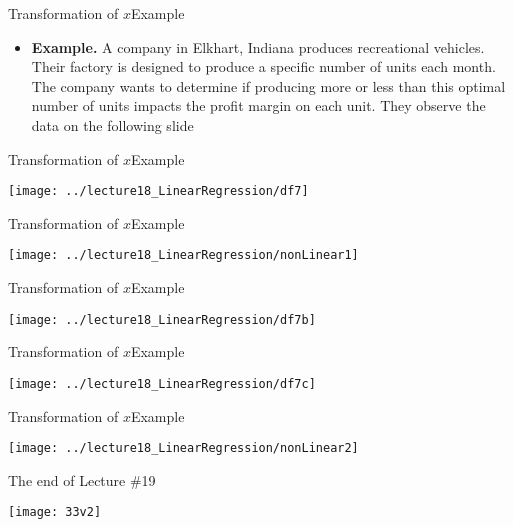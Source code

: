 \documentclass[xcolor=dvipsnames]{beamer}
\begin{document}
\begin{frame}{Transformation of $x$}{Example}
	\begin{itemize}
		\item \textbf{Example.} A company in Elkhart, Indiana produces recreational vehicles. Their factory is designed to produce a specific number of units each month. The company wants to determine if producing more or less than this optimal number of units impacts the profit margin on each unit. They observe the data on the following slide
	\end{itemize}
\end{frame}

\begin{frame}{Transformation of $x$}{Example}
	\begin{center}
		\texttt{[image: ../lecture18\_LinearRegression/df7]}
	\end{center}
\end{frame}

\begin{frame}{Transformation of $x$}{Example}
	\begin{center}
		\texttt{[image: ../lecture18\_LinearRegression/nonLinear1]}
	\end{center}
\end{frame}

\begin{frame}{Transformation of $x$}{Example}
	\begin{center}
		\texttt{[image: ../lecture18\_LinearRegression/df7b]}
	\end{center}
\end{frame}

\begin{frame}{Transformation of $x$}{Example}
	\begin{center}
		\texttt{[image: ../lecture18\_LinearRegression/df7c]}
	\end{center}
\end{frame}

\begin{frame}{Transformation of $x$}{Example}
	\begin{center}
		\texttt{[image: ../lecture18\_LinearRegression/nonLinear2]}
	\end{center}
\end{frame}

\begin{frame}{The end of Lecture \#19}
	\begin{center}
		\texttt{[image: 33v2]}
	\end{center}
\end{frame}
\end{document}
